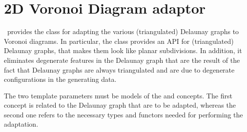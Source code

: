 

\chapter{2D Voronoi Diagram adaptor}
\label{ref-chapter-vda2}


\cgal\ provides the class
 for
adapting the various (triangulated) Delaunay graphs to Voronoi diagrams.
In particular, the class 
provides an API for (triangulated) Delaunay graphs, that makes them
look like planar subdivisions. In addition, it eliminates degenerate
features in the Delaunay graph that are the result of the fact that
Delaunay graphs are always triangulated and are due to degenerate
configurations in the generating data.

The two template parameters must be models of the
 and  concepts. The first concept
is related to the Delaunay graph that are to be adapted, whereas the
second one refers to the necessary types and functors needed for
performing the adaptation. 

\\
\\
\\
\\
\\
\\
\\
\\
\\
\\
\\
%

